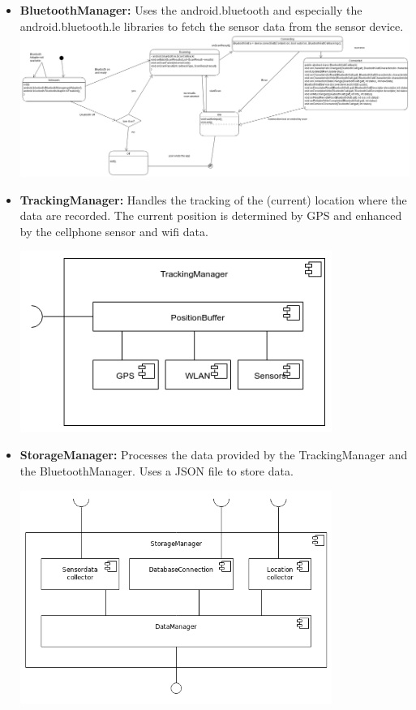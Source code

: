 \begin{itemize}
  \item \textbf{BluetoothManager:} Uses the android.bluetooth and especially the android.bluetooth.le libraries to fetch the sensor data from the sensor device. \\
  
 \hspace{-4cm} \includegraphics[width=1.4\textwidth]{pics/bt_state.png}
  
  \item \textbf{TrackingManager:} Handles the tracking of the (current) location where the data are recorded. The current position is determined by GPS and enhanced by the cellphone sensor and wifi data.

 \includegraphics[width=0.8\textwidth]{pics/TrackingManager_Composition.png}

  \item \textbf{StorageManager:} Processes the data provided by the TrackingManager and the BluetoothManager. Uses a JSON file to store data.

 \includegraphics[width=0.8\textwidth]{pics/StorageMgr_Composition.png}


\end{itemize}
